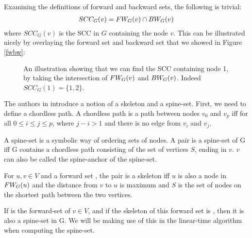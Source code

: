 \documentclass[../master/master.tex]{subfiles}
\begin{document}
\noindent Examining the definitions of forward and backward sets, the following is trivial:
\begin{align}
SCC_G(v) = FW_{G}(v) \cap BW_{G}(v) \label{scc}
\end{align} 
where $SCC_G(v)$ is the SCC in $G$ containing the node $v$. This can be illustrated nicely by overlaying the forward set and backward set that we showed in Figure \ref{fwbw}:


\begin{figure}[H]
\center
{}
\caption{An illustration showing that we can find the SCC containing node 1, by taking the intersection of $FW_{G}(v)$ and $BW_{G}(v)$. Indeed $SCC_G(1) = \{1,2\}$. } 
\end{figure}

The authors in \cite{linear} introduce a notion of a skeleton and a spine-set. First, we need to define a chordless path. A chordless path is a path between nodes $v_0$ and $v_p$ iff for all $0\leq i \leq j \leq p$, where $j-i>1$ and there is no edge from $v_i$ and $v_j$.

A spine-set is a symbolic way of ordering sets of nodes. A pair  is a spine-set of G iff G contains a chordless path consisting of the set of vertices $S$, ending in $v$. $v$ can also be called the spine-anchor of the spine-set.

For $u, v \in V$ and a forward set , the pair  is a skeleton iff $u$ is also a node in $FW_{G}(u)$ and the distance from $v$ to $u$ is maximum and $S$ is the set of nodes on the shortest path between the two vertices.

If  is the forward-set of $v \in V$, and if the skeleton of this forward set is , then it is also a spine-set in G. We will be making use of this in the linear-time algorithm when computing the spine-set. 
\end{document}
